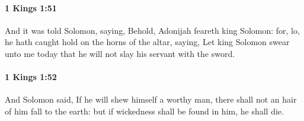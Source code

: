		\paragraph{1 Kings 1:51} %
			\label{1KINGS-1-51}

			And it was told Solomon, saying, Behold, Adonijah feareth king Solomon: for, lo, he hath caught hold on the horns of the altar, saying, Let king Solomon swear unto me today that he will not slay his servant with the sword.


		\paragraph{1 Kings 1:52} %
			\label{1KINGS-1-52}

			And Solomon said, If he will shew himself a worthy man, there shall not an hair of him fall to the earth: but if wickedness shall be found in him, he shall die.

